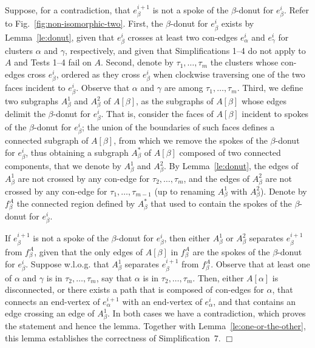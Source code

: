 \documentclass[letter,runningheads]{llncs}
\renewenvironment{proof}
{{\em Proof.\ }}{\hspace*{\fill}$\Box$\par\vspace{2mm}}
\begin{document}
\begin{proof}
Suppose, for a contradiction, that $e^{i+1}_\beta$ is not a spoke of the $\beta$-donut for $e^i_\beta$. Refer to Fig.~\ref{fig:non-isomorphic-two}. First, the $\beta$-donut for $e^i_\beta$ exists by Lemma~\ref{le:donut}, given that $e^i_\beta$ crosses at least two con-edges $e^i_\alpha$ and $e^i_{\gamma}$ for clusters $\alpha$ and $\gamma$, respectively, and given that {\sc Simplifications 1--4} do not apply to $A$ and {\sc Tests 1--4} fail on $A$. Second, denote by $\tau_1,\dots,\tau_m$ the clusters whose con-edges cross $e^i_\beta$, ordered as they cross $e^i_\beta$ when clockwise traversing one of the two faces incident to $e^i_\beta$. Observe that $\alpha$ and $\gamma$ are among $\tau_1,\dots,\tau_m$. Third, we define two subgraphs $A^{1}_\beta$ and $A^{2}_\beta$ of $A[\beta]$, as the subgraphs of $A[\beta]$ whose edges delimit the $\beta$-donut for $e^i_\beta$. That is, consider the faces of $A[\beta]$ incident to spokes of the $\beta$-donut for $e^i_\beta$; the union of the boundaries of such faces defines a connected subgraph of $A[\beta]$, from which we remove the spokes of the $\beta$-donut for $e^i_\beta$, thus obtaining a subgraph $A^*_{\beta}$ of $A[\beta]$ composed of two connected components, that we denote by $A^{1}_\beta$ and $A^{2}_\beta$. By Lemma~\ref{le:donut}, the edges of $A^{1}_\beta$ are not crossed by any con-edge for $\tau_2,\dots,\tau_m$, and the edges of $A^{2}_\beta$ are not crossed by any con-edge for $\tau_1,\dots,\tau_{m-1}$ (up to renaming $A^{1}_\beta$ with $A^{2}_\beta$). Denote by $f^A_{\beta}$ the connected region defined by $A^*_{\beta}$ that used to contain the spokes of the $\beta$-donut for $e^i_\beta$.

If $e^{i+1}_\beta$ is not a spoke of the $\beta$-donut for $e^i_\beta$, then either $A^{1}_\beta$ or $A^{2}_\beta$ separates $e^{i+1}_\beta$ from $f^A_{\beta}$, given that the only edges of $A[\beta]$ in $f^A_{\beta}$ are the spokes of the $\beta$-donut for $e^i_\beta$. Suppose w.l.o.g. that $A^{1}_\beta$ separates $e^{i+1}_\beta$ from $f^A_{\beta}$. Observe that at least one of $\alpha$ and $\gamma$ is in $\tau_2,\dots,\tau_m$, say that $\alpha$ is in $\tau_2,\dots,\tau_m$. Then, either $A[\alpha]$ is disconnected, or there exists a path that is composed of con-edges for $\alpha$, that connects an end-vertex of $e^{i+1}_\alpha$ with an end-vertex of $e^{i}_\alpha$, and that contains an edge crossing an edge of $A^{1}_\beta$. In both cases we have a contradiction, which proves the statement and hence the lemma. Together with Lemma~\ref{le:one-or-the-other}, this lemma establishes the correctness of {\sc Simplification~7}.
\end{proof}
\end{document}
